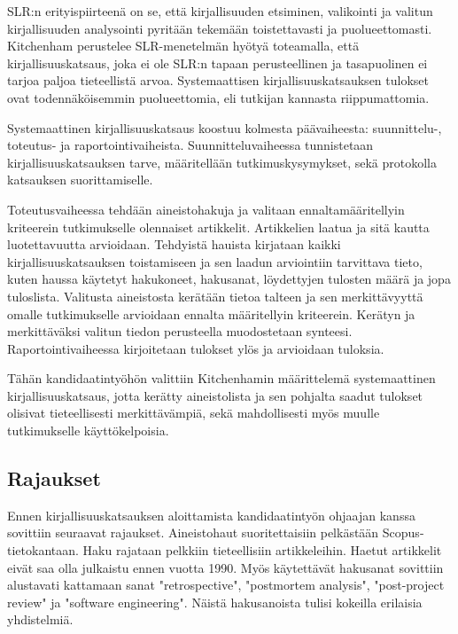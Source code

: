 SLR:n erityispiirteenä on se, että kirjallisuuden etsiminen, valikointi ja valitun kirjallisuuden analysointi pyritään tekemään toistettavasti ja puolueettomasti. Kitchenham perustelee SLR-menetelmän hyötyä toteamalla, että kirjallisuuskatsaus, joka ei ole SLR:n tapaan perusteellinen ja tasapuolinen ei tarjoa paljoa tieteellistä arvoa. Systemaattisen kirjallisuuskatsauksen tulokset ovat todennäköisemmin puolueettomia, eli tutkijan kannasta riippumattomia. \citep{Kitchenham2007}

Systemaattinen kirjallisuuskatsaus koostuu kolmesta päävaiheesta: suunnittelu-, toteutus- ja raportointivaiheista. Suunnitteluvaiheessa tunnistetaan kirjallisuuskatsauksen tarve, määritellään tutkimuskysymykset, sekä protokolla katsauksen suorittamiselle. \citep{Kitchenham2007}

Toteutusvaiheessa tehdään aineistohakuja ja valitaan ennaltamääritellyin kriteerein tutkimukselle olennaiset artikkelit. Artikkelien laatua ja sitä kautta luotettavuutta arvioidaan. Tehdyistä hauista kirjataan kaikki kirjallisuuskatsauksen toistamiseen ja sen laadun arviointiin tarvittava tieto, kuten haussa käytetyt hakukoneet, hakusanat, löydettyjen tulosten määrä ja jopa tuloslista. Valitusta aineistosta kerätään tietoa talteen ja sen merkittävyyttä omalle tutkimukselle arvioidaan ennalta määritellyin kriteerein. Kerätyn ja merkittäväksi valitun tiedon perusteella muodostetaan synteesi. Raportointivaiheessa kirjoitetaan tulokset ylös ja arvioidaan tuloksia. \citep{Kitchenham2007}

Tähän kandidaatintyöhön valittiin Kitchenhamin määrittelemä systemaattinen kirjallisuuskatsaus, jotta kerätty aineistolista ja sen pohjalta saadut tulokset olisivat tieteellisesti merkittävämpiä, sekä mahdollisesti myös muulle tutkimukselle käyttökelpoisia.

\subsection{Rajaukset}
Ennen kirjallisuuskatsauksen aloittamista kandidaatintyön ohjaajan kanssa sovittiin seuraavat rajaukset. Aineistohaut suoritettaisiin pelkästään Scopus-tietokantaan. Haku rajataan pelkkiin tieteellisiin artikkeleihin. Haetut artikkelit eivät saa olla julkaistu ennen vuotta 1990. Myös käytettävät hakusanat sovittiin alustavati kattamaan sanat "retrospective",  "postmortem analysis", "post-project review" ja "software engineering". Näistä hakusanoista tulisi kokeilla erilaisia yhdistelmiä.

